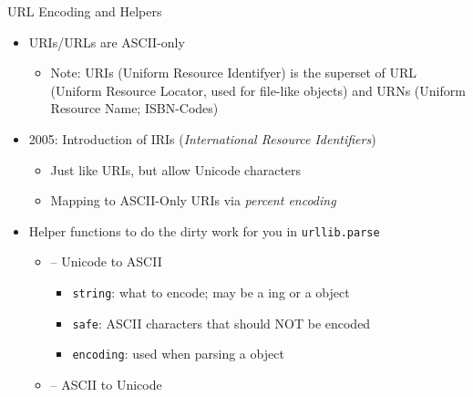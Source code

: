 \begin{frame}[fragile]{URL Encoding and Helpers}
%
\begin{itemize}
\item URIs/URLs are ASCII-only
	\begin{itemize}
	\item Note: URIs (Uniform Resource Identifyer) is the superset of 
	URL (Uniform Resource Locator, used for file-like objects) and URNs (Uniform Resource Name; \zB ISBN-Codes)
	\end{itemize}
\pause
\item 2005: Introduction of IRIs (\emph{International Resource Identifiers})
	\begin{itemize}
	\item Just like URIs, but allow Unicode characters
	\item Mapping to ASCII-Only URIs via \emph{percent encoding}
	\end{itemize}
\pause
\item Helper functions to do the dirty work for you in \texttt{urllib.parse}
	\begin{itemize}
	\item {} -- Unicode to ASCII
		\begin{itemize}
		\item \texttt{string}: what to encode; may be a ing or a  object
		\item \texttt{safe}: ASCII characters that should NOT be encoded
		\item \texttt{encoding}: used when parsing a  object
		\end{itemize}
	\item {} -- ASCII to Unicode
	\end{itemize}
\end{itemize}
%
\end{frame}


